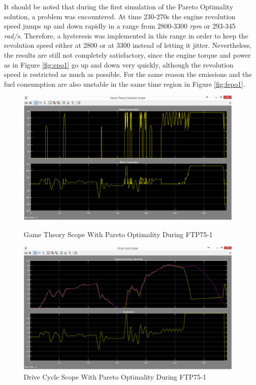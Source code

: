 It should be noted that during the first simulation of the Pareto Optimality solution, a problem was encountered. At time 230-270s the engine revolution speed jumps up and down rapidly in a range from 2800-3300 \textit{rpm} or 293-345 \textit{rad/s}. Therefore, a hysteresis was implemented in this range in order to keep the revolution speed either at 2800 or at 3300 instead of letting it jitter. Nevertheless, the results are still not completely satisfactory, since the engine torque and power as in Figure \ref{fig:epo1} go up and down very quickly, although the revolution speed is restricted as much as possible. For the same reason the emissions and the fuel consumption are also unstable in the same time region in Figure \ref{fig:fepo1}.

\begin{figure}[hp]
\centering
\includegraphics[scale=0.475]{figures/Pareto/FTP75-1/gameTheory30Juni}
\caption{Game Theory Scope With Pareto Optimality During FTP75-1}
\label{fig:gtpo1}
\includegraphics[scale=0.45]{figures/Pareto/FTP75-1/driveCycle30Juni}
\caption{Drive Cycle Scope With Pareto Optimality During FTP75-1}
\label{fig:dcpo1}
\end{figure}


